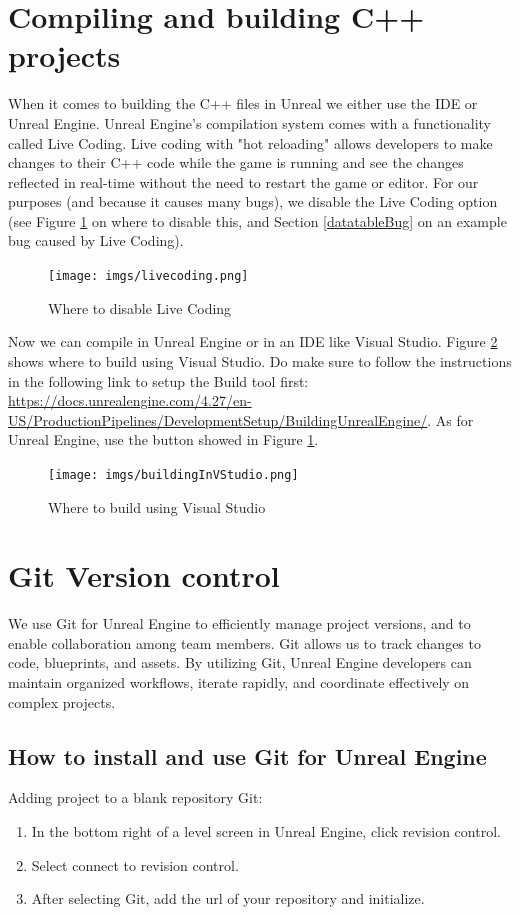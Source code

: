 \documentclass{uva-inf-article}
\begin{document}
\section{Compiling and building C++ projects}\label{CompilingAndBuilding}
When it comes to building the C++ files in Unreal we either use the IDE or Unreal Engine. Unreal Engine's compilation system comes with a functionality called Live Coding. Live coding with "hot reloading" allows developers to make changes to their C++ code while the game is running and see the changes reflected in real-time without the need to restart the game or editor. For our purposes (and because it causes many bugs), we disable the Live Coding option (see Figure \ref{fig:liveCoding} on where to disable this, and Section \ref{datatableBug} on an example bug caused by Live Coding).
\begin{figure}[hbt!]
    \centering
    \texttt{[image: imgs/livecoding.png]}
    \caption{Where to disable Live Coding}
    \label{fig:liveCoding}
\end{figure}

Now we can compile in Unreal Engine or in an IDE like Visual Studio. Figure \ref{fig:vstudio} shows where to build using Visual Studio. Do make sure to follow the instructions in the following link to setup the Build tool first: \url{https://docs.unrealengine.com/4.27/en-US/ProductionPipelines/DevelopmentSetup/BuildingUnrealEngine/}. As for Unreal Engine, use the button showed in Figure \ref{fig:liveCoding}.

\begin{figure}[hbt!]
    \centering
    \texttt{[image: imgs/buildingInVStudio.png]}
    \caption{Where to build using Visual Studio}
    \label{fig:vstudio}
\end{figure}
\section{Git Version control}
We use Git for Unreal Engine to efficiently manage project versions, and to enable collaboration among team members. Git allows us to track changes to code, blueprints, and assets. By utilizing Git, Unreal Engine developers can maintain organized workflows, iterate rapidly, and coordinate effectively on complex projects.

\subsection{How to install and use Git for Unreal Engine}
Adding project to a blank repository Git:
\begin{enumerate}
    \item In the bottom right of a level screen in Unreal Engine, click revision control.
    \item Select connect to revision control.
    \item After selecting Git, add the url of your repository and initialize.
\end{enumerate}
\end{document}
